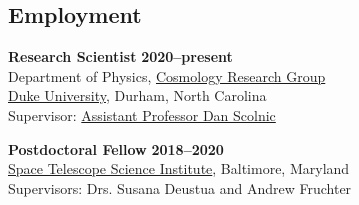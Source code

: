 \documentclass[margin]{res}
\begin{document}
\begin{resume}

\section{Employment} 

{\bf Research Scientist} \hfill {\bf 2020--present}\\
Department of Physics, \href{https://phy.duke.edu/research/research-areas/astrophysics}{Cosmology Research Group}\\
\href{https://phy.duke.edu}{Duke University}, Durham, North Carolina\\ 
Supervisor: \href{https://phy.duke.edu/people/daniel-m-scolnic}{Assistant Professor Dan Scolnic}

{\bf Postdoctoral Fellow} \hfill {\bf 2018--2020}\\
\href{http://www.stsci.edu}{Space Telescope Science Institute}, Baltimore, Maryland\\ 
Supervisors: Drs. Susana Deustua and Andrew Fruchter


 






\end{resume}
\end{document}
